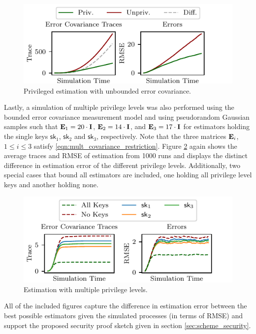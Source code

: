 \documentclass[letterpaper, 10 pt, conference]{ieeeconf}
\begin{document}
\begin{figure}[htbp]
   \centering
   \includegraphics{pictures/single_level_unbounded.pdf}
   \caption{Privileged estimation with unbounded error covariance.}
   \label{fig:single_unbounded}
\end{figure}

Lastly, a simulation of multiple privilege levels was also performed using the bounded error covariance measurement model and using pseudorandom Gaussian samples such that ${{\mathbf{E}}}_1=20 \cdot {\ensuremath{{\mathbf{I}}}}$, ${{\mathbf{E}}}_2=14 \cdot {\ensuremath{{\mathbf{I}}}}$, and ${{\mathbf{E}}}_3=17 \cdot {\ensuremath{{\mathbf{I}}}}$ for estimators holding the single keys $\mathsf{sk}_1$, $\mathsf{sk}_2$ and $\mathsf{sk}_3$, respectively. Note that the three matrices ${{\mathbf{E}}}_i$, $1 \leq i \leq 3$ satisfy \eqref{eqn:mult_covariance_restriction}. Figure \ref{fig:multiple_bounded} again shows the average traces and RMSE of estimation from 1000 runs and displays the distinct difference in estimation error of the different privilege levels. Additionally, two special cases that bound all estimators are included, one holding all privilege level keys and another holding none.

\begin{figure}[htbp]
   \centering
   \includegraphics{pictures/multiple_level.pdf}
   \caption{Estimation with multiple privilege levels.}
   \label{fig:multiple_bounded}
\end{figure}

All of the included figures capture the difference in estimation error between the best possible estimators given the simulated processes (in terms of RMSE) and support the proposed security proof sketch given in section \ref{sec:scheme_security}.
\end{document}
